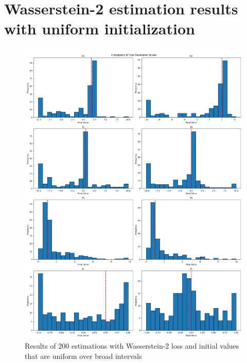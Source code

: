 \section{Wasserstein-2 estimation results with uniform initialization}
\label{sec:w2}

\begin{figure}[H]
    \includegraphics[width=\textwidth]{./Images/w2_wide_uniform_histograms.png}
    \caption{Results of 200 estimations with Wasserstein-2 loss and initial values that are uniform over broad intervals}
    \label{fig:w2_wide_uniform_histograms}
\end{figure}